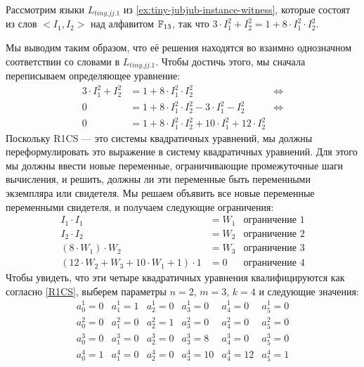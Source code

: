 \begin{example}
\label{ex:TJJ-r1cs}
 Рассмотрим языки $L_{tiny.jj.1}$ из \examplename{} \ref{ex:tiny-jubjub-instance-witness}, которые состоят из слов $<I_1,I_2>$ над алфавитом $\mathbb{F}_{13}$, так что $3\cdot I_1^2 + I_2^2 = 1 + 8\cdot I_1^2\cdot I_2^2$. 

Мы выводим  таким образом, что её решения находятся во взаимно однозначном соответствии со словами в $L_{tiny.jj.1}$. Чтобы достичь этого, мы сначала переписываем определяющее уравнение:
\begin{align*}
3\cdot I_1^2 + I_2^2  & = 1 + 8\cdot I_1^2\cdot I_2^2 & \Leftrightarrow \\
 0 & = 1 + 8\cdot I_1^2\cdot I_2^2 - 3\cdot I_1^2 - I_2^2  & \Leftrightarrow \\
 0 & = 1 + 8\cdot I_1^2\cdot I_2^2 + 10\cdot I_1^2 +12\cdot I_2^2
\end{align*}
Поскольку R1CS — это системы квадратичных уравнений, мы должны переформулировать это выражение в систему квадратичных уравнений. Для этого мы должны ввести новые переменные, ограничивающие промежуточные шаги вычисления, и решить, должны ли эти переменные быть переменными экземпляра или свидетеля. Мы решаем объявить все новые переменные переменными свидетеля, и получаем следующие ограничения:
\begin{align*}
I_1 \cdot I_1 & = W_1 & \text{ограничение } 1\\
I_2 \cdot I_2 & = W_2 & \text{ограничение } 2\\
(8 \cdot W_1) \cdot W_2 & = W_3 & \text{ограничение } 3\\
(12\cdot W_2 + W_3 + 10\cdot W_1 + 1)\cdot 1 & = 0 & \text{ограничение } 4
\end{align*}
Чтобы увидеть, что эти четыре квадратичных уравнения квалифицируются как  согласно  \ref{R1CS}, выберем параметры $n=2$, $m=3$, $k=4$ и следующие значения:
$$
\begin{array}{llllll}
a_0^1 = 0 & a_1^1= 1 & a_2^1= 0 & a_3^1 = 0 & a_4^1= 0  & a_5^1= 0 \\ 
a_0^2 = 0 & a_1^2= 0 & a_2^2= 1 & a_3^2 = 0 & a_4^2= 0  & a_5^2= 0 \\ 
a_0^3 = 0 & a_1^3= 0 & a_2^3= 0 & a_3^3 = 8 & a_4^3= 0  & a_5^3= 0 \\ 
a_0^4 = 1 & a_1^4= 0 & a_2^4= 0 & a_3^4 = 10 & a_4^4= 12  & a_5^4= 1 \\ 
\\

\end{array}$$
\end{example}
